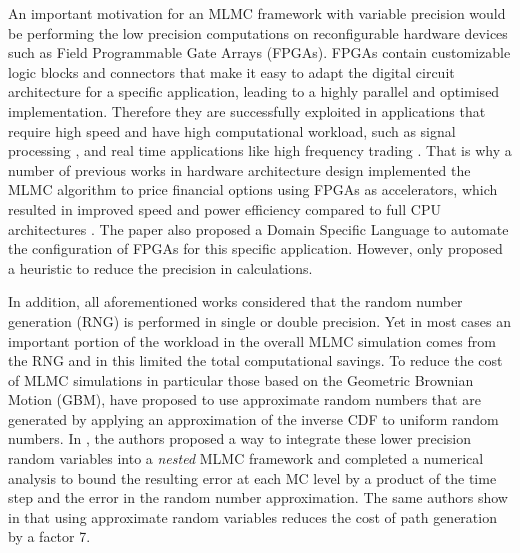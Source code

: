 An important motivation for an MLMC framework with variable precision would be performing the low precision computations on reconfigurable hardware devices such as Field Programmable Gate Arrays (FPGAs). FPGAs contain customizable logic blocks and connectors that make it easy to adapt the digital circuit architecture for a specific application, leading to a highly parallel and optimised implementation. Therefore they are successfully exploited in applications that require high speed and have high computational workload, such as signal processing \cite{woods2008fpga}, and real time applications like high frequency trading \cite{HFT1,HFT2}. That is why a number of previous works in hardware architecture design implemented the MLMC algorithm to price financial options using FPGAs as accelerators, which resulted in improved speed and power efficiency compared to full CPU architectures \cite{Schryver2013AMM}. The paper \cite{lindsey2016domain} also proposed 
a Domain Specific Language to automate the configuration of FPGAs for this specific application. However, only \cite{brugger2014mixed} proposed a heuristic to reduce the precision in calculations.

In addition, all aforementioned works considered that the random number generation (RNG) is performed in single or double precision. Yet in most cases an important portion of the workload in the overall MLMC simulation comes from the RNG and in \cite{brugger2014mixed} this limited the total computational savings.
To reduce the cost of MLMC simulations in particular those based on the Geometric Brownian Motion (GBM), \cite{approximateICDF_Oliver, NestedOliver} have proposed to use approximate random numbers that are generated by applying an approximation of the inverse CDF to uniform random numbers. In \cite{NestedOliver}, the authors proposed a way to integrate these lower precision random variables into a \textit{nested} MLMC framework and completed a numerical analysis to bound the resulting error at each MC level by a product of the time step and the error in the random number approximation. The same authors show in \cite{approximateICDF_Oliver} that using approximate random variables reduces the cost of path generation by a factor 7.


